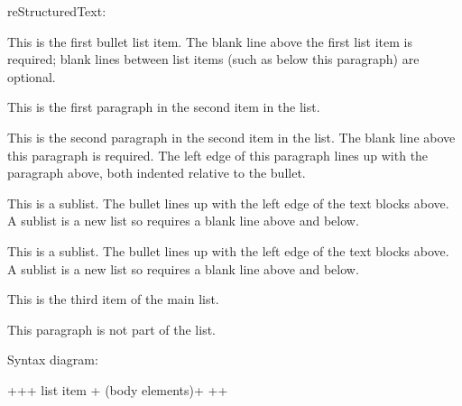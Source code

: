 \documentclass[letterpaper,11pt,english]{sphinxmanual}
\begin{document}
reStructuredText:

\begin{sphinxVerbatim}[commandchars=\\\{\}]
 This is the first bullet list item.  The blank line above the
  first list item is required; blank lines between list items
  (such as below this paragraph) are optional.

 This is the first paragraph in the second item in the list.

  This is the second paragraph in the second item in the list.
  The blank line above this paragraph is required.  The left edge
  of this paragraph lines up with the paragraph above, both
  indented relative to the bullet.

   This is a sublist.  The bullet lines up with the left edge of
    the text blocks above.  A sublist is a new list so requires a
    blank line above and below.

   This is a sublist.  The bullet lines up with the left edge of
the text blocks above.  A sublist is a new list so requires a
blank line above and below.

 This is the third item of the main list.

This paragraph is not part of the list.
\end{sphinxVerbatim}

Syntax diagram:

\begin{sphinxVerbatim}[commandchars=\\\{\}]
+\PYGZhy{}\PYGZhy{}\PYGZhy{}\PYGZhy{}\PYGZhy{}\PYGZhy{}+\PYGZhy{}\PYGZhy{}\PYGZhy{}\PYGZhy{}\PYGZhy{}\PYGZhy{}\PYGZhy{}\PYGZhy{}\PYGZhy{}\PYGZhy{}\PYGZhy{}\PYGZhy{}\PYGZhy{}\PYGZhy{}\PYGZhy{}\PYGZhy{}\PYGZhy{}\PYGZhy{}\PYGZhy{}\PYGZhy{}\PYGZhy{}\PYGZhy{}\PYGZhy{}+
 \PYGZdq{}\PYGZhy{} \PYGZdq{} \textbar{} list item             \textbar{}
+\PYGZhy{}\PYGZhy{}\PYGZhy{}\PYGZhy{}\PYGZhy{}\PYGZhy{}\textbar{} (body elements)+      \textbar{}
       +\PYGZhy{}\PYGZhy{}\PYGZhy{}\PYGZhy{}\PYGZhy{}\PYGZhy{}\PYGZhy{}\PYGZhy{}\PYGZhy{}\PYGZhy{}\PYGZhy{}\PYGZhy{}\PYGZhy{}\PYGZhy{}\PYGZhy{}\PYGZhy{}\PYGZhy{}\PYGZhy{}\PYGZhy{}\PYGZhy{}\PYGZhy{}\PYGZhy{}\PYGZhy{}+
\end{sphinxVerbatim}
\end{document}
